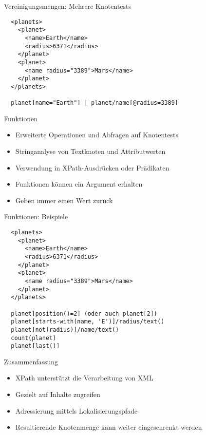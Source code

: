 \documentclass{beamer}
\begin{document}
\begin{frame}[fragile]{Vereinigungsmengen: Mehrere Knotentests}
	
	\lstset{language=XML}
	\begin{lstlisting}
  <planets>
    <planet>
      <name>Earth</name>
      <radius>6371</radius>
    </planet>
    <planet>
      <name radius="3389">Mars</name>
    </planet>
  </planets>
	
  planet[name="Earth"] | planet/name[@radius=3389]
	\end{lstlisting}
	
\end{frame}

\begin{frame}{Funktionen}
	
	\begin{itemize}
		\item Erweiterte Operationen und Abfragen auf Knotentests
		\item Stringanalyse von Textknoten und Attributwerten
		\item Verwendung in XPath-Ausdrücken oder Prädikaten
		\item Funktionen können ein Argument erhalten
		\item Geben immer einen Wert zurück
	\end{itemize}
	
\end{frame}

\begin{frame}[fragile]{Funktionen: Beispiele}
	
	\lstset{language=XML}
	\begin{lstlisting}
  <planets>
    <planet>
      <name>Earth</name>
      <radius>6371</radius>
    </planet>
    <planet>
      <name radius="3389">Mars</name>
    </planet>
  </planets>
	
  planet[position()=2] (oder auch planet[2])
  planet[starts-with(name, 'E')]/radius/text()
  planet[not(radius)]/name/text()
  count(planet)
  planet[last()]
	\end{lstlisting}
	
\end{frame}

\begin{frame}{Zusammenfassung}
	
	\begin{itemize}
		\item XPath unterstützt die Verarbeitung von XML
		\item Gezielt auf Inhalte zugreifen
		\item Adressierung mittels Lokalisierungspfade
		\item Resultierende Knotenmenge kann weiter eingeschrenkt werden
	\end{itemize}
	
\end{frame}
\end{document}

